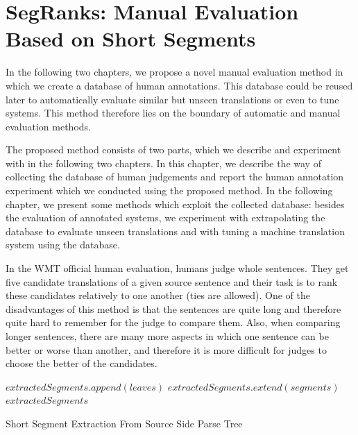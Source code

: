 \chapter{SegRanks: Manual Evaluation Based on Short Segments}
\label{chapter:segranks}

In the following two chapters, we propose a novel manual evaluation method in
which we create a database of human annotations. This database could be reused
later to automatically evaluate similar but unseen translations or even
to tune systems.  This method therefore lies on the boundary of automatic and
manual evaluation methods.

The proposed method consists of two parts, which we describe and experiment
with in the following two chapters. In this chapter, we describe the way of
collecting the database of human judgements and report the human annotation
experiment which we conducted using the proposed method. In the following
chapter, we present some methods which exploit the collected database: besides
the evaluation of annotated systems, we experiment with extrapolating the
database to evaluate unseen translations and with tuning a machine translation
system using the database.

In the WMT official human evaluation, humans judge whole sentences. They get
five candidate translations of a given source sentence and their task is to
rank these candidates relatively to one another (ties are allowed). One of
the disadvantages of this method is that the sentences are quite long and therefore
quite hard to remember for the judge to compare them. Also, when comparing
longer sentences, there are many more aspects in which one sentence can be
better or worse than another, and therefore it is more difficult for
judges to choose the better of the candidates. 

\begin{algorithm}
    \begin{algorithmic}[1]
                    \State $extractedSegments.append(leaves)$
                \EndIf
            \Else
                \State $extractedSegments.extend(segments)$
                \EndFor
            \EndIf
            \Return $extractedSegments$
        \EndFunction
    \end{algorithmic}
    \caption{Short Segment Extraction From Source Side Parse Tree}
    \label{segment:extraction}
\end{algorithm}

